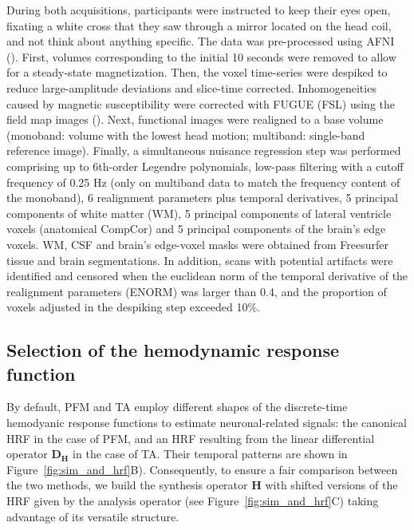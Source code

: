 During both acquisitions, participants were instructed to keep their eyes open, fixating a white cross that they saw through a mirror located on the head coil, and not think about anything specific. The data was pre-processed using AFNI (\citealt{Cox1996AFNISoftwareAnalysis}). First, volumes corresponding to the initial 10 seconds were removed to allow for a steady-state magnetization. Then, the voxel time-series were despiked to reduce large-amplitude deviations and slice-time corrected. Inhomogeneities caused by magnetic susceptibility were corrected with FUGUE (FSL) using the field map images (\citealt{Jenkinson2012FSL}). Next, functional images were realigned to a base volume (monoband: volume with the lowest head motion; multiband: single-band reference image). Finally, a simultaneous nuisance regression step was performed comprising up to 6th-order Legendre polynomials, low-pass filtering with a cutoff frequency of 0.25 Hz (only on multiband data to match the frequency content of the monoband), 6 realignment parameters plus temporal derivatives, 5 principal components of white matter (WM), 5 principal components of lateral ventricle voxels (anatomical CompCor) and 5 principal components of the brain's edge voxels. WM, CSF and brain's edge-voxel masks were obtained from Freesurfer tissue and brain segmentations. In addition, scans with potential artifacts were identified and censored when the euclidean norm of the temporal derivative of the realignment parameters (ENORM) was larger than 0.4, and the proportion of voxels adjusted in the despiking step exceeded 10\%.

\subsection{Selection of the hemodynamic response function}

By default, PFM and TA employ different shapes of the discrete-time hemodyanic response functions to estimate neuronal-related signals: the canonical HRF in the case of PFM, and an HRF resulting from the linear differential operator $\mathbf{D_H}$ in the case of TA. Their temporal patterns are shown in Figure~\ref{fig:sim_and_hrf}B). Consequently, to ensure a fair comparison between the two methods, we build the synthesis operator $\mathbf{H}$ with shifted versions of the HRF given by the analysis operator (see Figure~\ref{fig:sim_and_hrf}C) taking advantage of its versatile structure.

